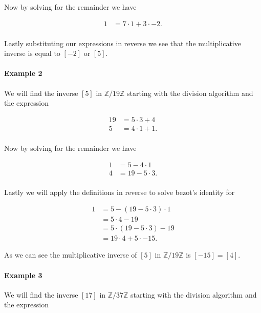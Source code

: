 \documentclass{article}
\begin{document}
      \noindent Now by solving for the remainder we have 

      \[
        \begin{split}
          1 &= 7 \cdot 1  + 3 \cdot -2.\\
        \end{split}
      \]

      \noindent Lastly substituting our expressions in reverse we see that the multiplicative inverse is equal to $[-2]$ or $[5]$.


      \paragraph{Example 2} We will find the inverse $[5]$ in $\mathbb{Z}/19\mathbb{Z}$ starting with the division algorithm and the expression

      \[
        \begin{split}
          19 &= 5 \cdot 3 + 4\\
          5 &= 4 \cdot 1 + 1.\\
        \end{split}
      \]
      
      \noindent Now by solving for the remainder we have 

      \[
        \begin{split}
          1 &=  5  - 4 \cdot 1\\
          4 &=  19 - 5 \cdot 3.\\ 
        \end{split}
      \]

      \noindent Lastly we will apply the definitions in reverse to solve bezot's identity for

      \[
        \begin{split}
          1 &=  5  - (19 - 5 \cdot 3) \cdot 1\\
            &=  5 \cdot 4 - 19\\
            &= 5 \cdot (19 - 5 \cdot 3) - 19\\
            &= 19 \cdot 4  + 5 \cdot -15.
        \end{split}
      \]

      \noindent As we can see the multiplicative inverse of $[5]$ in $\mathbb{Z}/19\mathbb{Z}$ is $[-15] = [4]$.


      \paragraph{Example 3} We will find the inverse $[17]$ in $\mathbb{Z}/37\mathbb{Z}$ starting with the division algorithm and the expression
\end{document}
